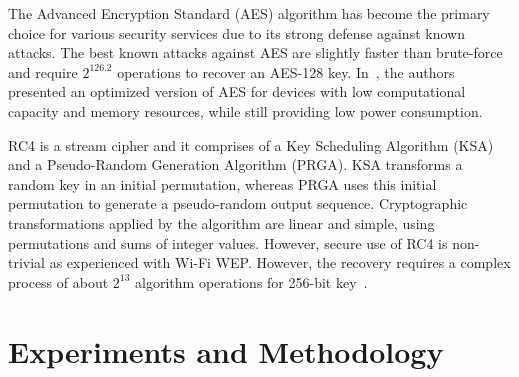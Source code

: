 \documentclass[journal]{IEEEtran}
\newcommand{\rever}{\textcolor{blue}}
\newcommand{\gn}[1]{{\color{red}{[#1]}}}
\begin{document}

The Advanced Encryption Standard (AES) algorithm has become the primary choice for various security services %
due to its strong defense against known attacks. The best known attacks against AES are slightly faster than brute-force and require $2^{126.2}$ operations to recover an AES-128 key. In~\cite{nasser2016aes}, the authors presented an optimized version of AES for devices with low computational capacity and memory resources, while still providing low power consumption. %

RC4 is a stream cipher and it comprises of a Key Scheduling Algorithm (KSA) and a Pseudo-Random Generation Algorithm (PRGA). KSA transforms a random key in an initial permutation, whereas PRGA uses this initial permutation to generate a pseudo-random output sequence. Cryptographic transformations applied by the algorithm are linear and simple, using permutations and sums of integer values. However, secure use of RC4 is non-trivial as experienced with Wi-Fi WEP. However, the recovery requires a complex process of about $2^{13}$ algorithm operations for 256-bit key~\cite{son2019fast}.

\vspace{-0.25cm}
\section{Experiments and Methodology}
%
\label{sec:Methodology}

\end{document}
